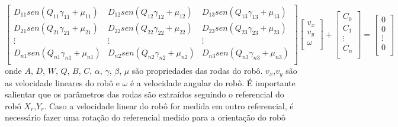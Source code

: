 \[
\begin{bmatrix}
    D_{11}sen(Q_{11}\gamma_{11} + \mu_{11}) &  D_{12}sen(Q_{12}\gamma_{12} + \mu_{12}) &  D_{13}sen(Q_{13}\gamma_{13} + \mu_{13})\\
    D_{21}sen(Q_{21}\gamma_{21} + \mu_{21}) &  D_{22}sen(Q_{22}\gamma_{22} + \mu_{22}) &  D_{23}sen(Q_{23}\gamma_{23} + \mu_{23})\\
    \vdots & \vdots & \vdots \\
    D_{n1}sen(Q_{n1}\gamma_{n1} + \mu_{n1}) &  D_{n2}sen(Q_{n2}\gamma_{n2} + \mu_{n2}) &  D_{n3}sen(Q_{n3}\gamma_{n3} + \mu_{n3})\\
\end{bmatrix}
\begin{bmatrix}
    v_x \\
    v_y \\
    \omega\\
\end{bmatrix}
+
\begin{bmatrix}
    C_0 \\
    C_1 \\
    \vdots \\
    C_n \\
\end{bmatrix}
=
\begin{bmatrix}
    0 \\
    0 \\
    \vdots \\
    0 \\
\end{bmatrix}
\]
onde $A$, $D$, $W$, $Q$, $B$, $C$, $\alpha$, $\gamma$, $\beta$, $\mu$
são propriedades das rodas do robô. $v_x$,$v_y$ são as velocidade lineares
do robô  e $\omega$ é a velocidade angular do robô.  É importante salientar
que os parâmetros das rodas são extraídos seguindo o referencial do robô $X_r$,$Y_r$.
Caso a velocidade linear do robô for medida em outro referencial, é necessário
fazer uma rotação do referencial medido para a orientação do robô

